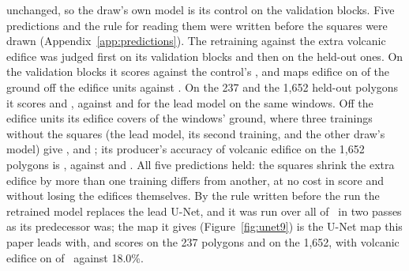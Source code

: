 unchanged, so the draw's own model is its control on the validation blocks. Five predictions and the rule for reading
them were written before the squares were drawn (Appendix~\ref{app:predictions}). %
The retraining against the extra volcanic edifice was judged first on its validation blocks and then on the held-out
ones. On the validation blocks it scores  against the control's
, and maps edifice on 
of the ground off the edifice units against . On the 237
and the 1,652 held-out polygons it scores  and
, against  and
 for the lead model on the same windows. Off the edifice units its edifice
covers  of the windows' ground, where three trainings without
the squares (the lead model, its second training, and the other draw's model) give
,  and
; its producer's accuracy of volcanic edifice on the 1,652
polygons is , against
 and .
All five predictions held: the squares shrink the extra edifice by more than one training differs from another, at
no cost in score and without losing the edifices themselves. By the rule written before the run the retrained model
replaces the lead U-Net, and it was run over all of \pmsixty\ in two passes as its predecessor was; the map it gives
(Figure~\ref{fig:unet9}) is the U-Net map this paper leads with, and scores  on the 237 polygons and
 on the 1,652, with volcanic edifice on  of \pmsixty\ against 18.0\%.
